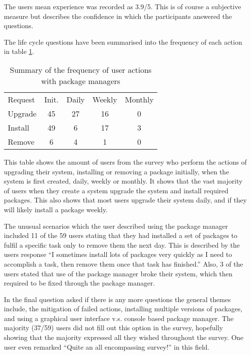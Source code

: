 The users mean experience was recorded as 3.9/5.
This is of course a subjective measure but describes the confidence in which the participants answered the questions. 

The life cycle questions have been summarised into the frequency of each action in table \ref {strat.tblaction}.

\begin{table}[htp]
\begin{tabular}{l | c | c | c | c |}
Request & Init. & Daily & Weekly & Monthly \\
Upgrade  & 45 & 27 & 16 & 0 \\
Install & 49 & 6 & 17 & 3 \\
Remove & 6 & 4 & 1 & 0\\
\end{tabular}
\caption{Summary of the frequency of user actions with package managers}
\label{strat.tblaction}
\end{table}

This table shows the amount of users from the survey who perform the actions of upgrading their system, installing or removing a package 
initially, when the system is first created, daily, weekly or monthly.
It shows that the vast majority of users when they create a system upgrade the system and install required packages.
This also shows that most users upgrade their system daily, and if they will likely install a package weekly.

The unusual scenarios which the user described using the package manager included 
11 of the 59 users stating that they had installed a set of packages to fulfil a specific task only to remove them the next day.
This is described by the users response ``I sometimes install lots of packages very quickly as I need to accomplish a task, then remove them once that task has finished.''
Also, 3 of the users stated that use of the package manager broke their system, which then required to be fixed through the package manager.

In the final question asked if there is any more questions the general themes include, 
the mitigation of failed actions, installing multiple versions of packages, and using a graphical user interface v.s. console based package manager.
The majority (37/59) users did not fill out this option in the survey, hopefully showing that the majority expressed all they wished throughout the survey.
One user even remarked ``Quite an all encompassing survey!'' in this field.


